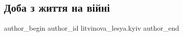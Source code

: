  
 
 
 
 

\subsection{Доба з  життя на війні}
\label{sec:27_05_2023.fb.litvinova_lesya.kyiv.1.doba_z_zhyttja_na_vijni}

\ifcmt
 author_begin
   author_id litvinova_lesya.kyiv
 author_end
\fi

